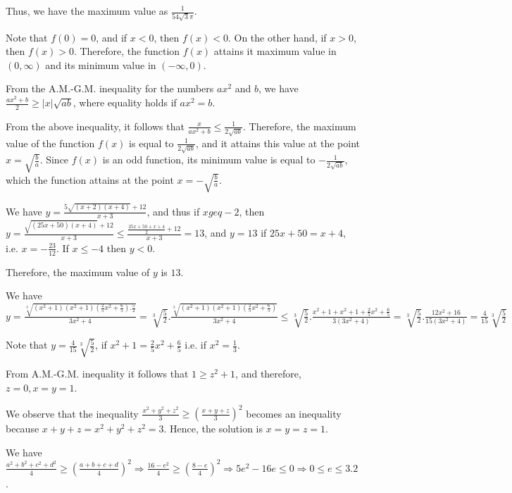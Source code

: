   Thus, we have the maximum value as $\frac{1}{54\sqrt{3}\pi}$.
\item Note that $f(0) = 0$, and if $x < 0$, then $f(x) < 0$. On the other hand, if $x > 0$, then $f(x) >
  0$. Therefore, the function $f(x)$ attains it maximum value in $(0, \infty)$ and its minimum value in
  $(-\infty, 0)$.

  From the A.M.-G.M. inequality for the numbers $ax^2$ and $b$, we have $\frac{ax^2 + b}{2}\geq
  |x|\sqrt{ab}$, where equality holds if $ax^2 = b$.

  From the above inequality, it follows that $\frac{x}{ax^2 + b}\leq \frac{1}{2\sqrt{ab}}$. Therefore, the
  maximum value of the function $f(x)$ is equal to $\frac{1}{2\sqrt{ab}}$, and it attains this value at the
  point $x = \sqrt{\frac{b}{a}}$. Since $f(x)$ is an odd function, its minimum value is equal to
  $-\frac{1}{2\sqrt{ab}}$, which the function attains at the point $x = -\sqrt{\frac{b}{a}}$.
\item We have $y = \frac{5\sqrt{(x + 2)(x + 4)} + 12}{x + 3}$, and thus if $x geq -2$, then $y =
  \frac{\sqrt{(25x + 50)(x + 4)} + 12}{x + 3}\leq \frac{\frac{25x + 50 + x + 4}{2} + 12}{x + 3} = 13$, and
  $y = 13$ if $25x + 50 = x + 4$, i.e. $x = -\frac{23}{12}$. If $x \leq -4$ then $y < 0$.

  Therefore, the maximum value of $y$ is $13$.
\item We have $y = \displaystyle\frac{\sqrt[3]{(x^2 + 1)(x^2 + 1)\left(\frac{2}{5}x^2 + \frac{6}{5}\right).\frac{5}{2}}}{3x^2 + 4} =
  \sqrt[3]{\frac{5}{2}}.\frac{\sqrt[3]{(x^2 + 1)(x^2 + 1)\left(\frac{2}{5}x^2 + \frac{6}{5}\right)}}{3x^2 + 4}\leq
    \sqrt[3]{\frac{5}{2}}.\frac{x^2 + 1 + x^2 + 1 + \frac{2}{5}x^2 + \frac{6}{5}}{3(3x^2 + 4)} =
    \sqrt[3]{\frac{5}{2}}.\frac{12x^2 + 16}{15(3x^2 + 4)} = \frac{4}{15}\sqrt[3]{\frac{5}{2}}$

    Note that $y = \frac{4}{15}\sqrt[3]{\frac{5}{2}}$, if $x^2 + 1= \frac{2}{5}x^2 + \frac{6}{5}$ i.e. if
    $x^2 = \frac{1}{3}$.
\item From A.M.-G.M. inequality it follows that $1\geq z^2 + 1$, and therefore, $z = 0, x = y = 1$.
\item We observe that the inequality $\frac{x^2 + y^2 + z^2}{3}\geq \left(\frac{x + y + z}{3}\right)^2$
  becomes an inequality because $x + y + z = x^2 + y^2 + z^2 = 3$. Hence, the solution is $x = y = z = 1$.
\item We have $\frac{a^2 + b^2 + c^2 + d^2}{4}\geq \left(\frac{a + b + c + d}{4}\right)^2 \Rightarrow
  \frac{16 - e^2}{4}\geq \left(\frac{8 - e}{4}\right)^2\Rightarrow 5e^2 - 16e\leq 0 \Rightarrow 0\leq e\leq
  3.2$.

